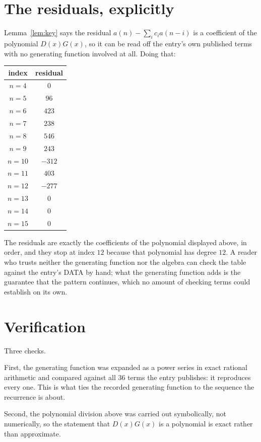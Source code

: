\documentclass[11pt,a4paper]{article}
\theoremstyle{plain}
\theoremstyle{definition}
\begin{document}
\section{The residuals, explicitly}

Lemma~\ref{lem:key} says the residual $a(n)-\sum_ic_ia(n-i)$ is a coefficient of the
polynomial $D(x)G(x)$, so it can be read off the entry's own published terms with no
generating function involved at all. Doing that:
\begin{center}
\begin{tabular}{cc}
index & residual \\ \hline
$n=4$ & $0$ \\
$n=5$ & $96$ \\
$n=6$ & $423$ \\
$n=7$ & $238$ \\
$n=8$ & $546$ \\
$n=9$ & $243$ \\
$n=10$ & $-312$ \\
$n=11$ & $403$ \\
$n=12$ & $-277$ \\
$n=13$ & $0$ \\
$n=14$ & $0$ \\
$n=15$ & $0$
\end{tabular}
\end{center}
The residuals are exactly the coefficients of the polynomial displayed above, in order, and
they stop at index $12$ because that polynomial has degree $12$. A reader who trusts
neither the generating function nor the algebra can check the table against the entry's DATA
by hand; what the generating function adds is the guarantee that the pattern continues, which
no amount of checking terms could establish on its own.

\section{Verification}

Three checks.

First, the generating function was expanded as a power series in exact rational arithmetic and
compared against all $36$ terms the entry publishes: it reproduces every one. This is
what ties the recorded generating function to the sequence the recurrence is about.

Second, the polynomial division above was carried out symbolically, not numerically, so the
statement that $D(x)G(x)$ is a polynomial is exact rather than approximate.
\end{document}
